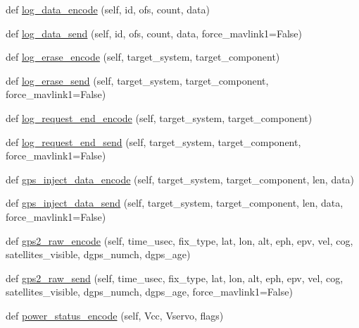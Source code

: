 \begin{DoxyCompactItemize}
\item 
def \hyperlink{classpymavlink_1_1dialects_1_1v10_1_1MAVLink_abf72df1eed5d0c8715720c2bd14c33c7}{log\+\_\+data\+\_\+encode} (self, id, ofs, count, data)
\item 
def \hyperlink{classpymavlink_1_1dialects_1_1v10_1_1MAVLink_ad56e75fea074bab726d216c0168854ac}{log\+\_\+data\+\_\+send} (self, id, ofs, count, data, force\+\_\+mavlink1=False)
\item 
def \hyperlink{classpymavlink_1_1dialects_1_1v10_1_1MAVLink_ad18343a2660ccd8e7c4ca8860cbc864a}{log\+\_\+erase\+\_\+encode} (self, target\+\_\+system, target\+\_\+component)
\item 
def \hyperlink{classpymavlink_1_1dialects_1_1v10_1_1MAVLink_a490ae561c069e23a64a2b53cd5ad55c0}{log\+\_\+erase\+\_\+send} (self, target\+\_\+system, target\+\_\+component, force\+\_\+mavlink1=False)
\item 
def \hyperlink{classpymavlink_1_1dialects_1_1v10_1_1MAVLink_a4c1900a7ffb5b8ef7ac90eccac9fe886}{log\+\_\+request\+\_\+end\+\_\+encode} (self, target\+\_\+system, target\+\_\+component)
\item 
def \hyperlink{classpymavlink_1_1dialects_1_1v10_1_1MAVLink_a36ee9dc492940d4d54b5c0b4d95f3016}{log\+\_\+request\+\_\+end\+\_\+send} (self, target\+\_\+system, target\+\_\+component, force\+\_\+mavlink1=False)
\item 
def \hyperlink{classpymavlink_1_1dialects_1_1v10_1_1MAVLink_a01573fb71a7ef4636652f95a3a255eea}{gps\+\_\+inject\+\_\+data\+\_\+encode} (self, target\+\_\+system, target\+\_\+component, len, data)
\item 
def \hyperlink{classpymavlink_1_1dialects_1_1v10_1_1MAVLink_a3f7f176cd16a16186c333b3e1a28e394}{gps\+\_\+inject\+\_\+data\+\_\+send} (self, target\+\_\+system, target\+\_\+component, len, data, force\+\_\+mavlink1=False)
\item 
def \hyperlink{classpymavlink_1_1dialects_1_1v10_1_1MAVLink_ab4c1a2230160becc07205df19f831a77}{gps2\+\_\+raw\+\_\+encode} (self, time\+\_\+usec, fix\+\_\+type, lat, lon, alt, eph, epv, vel, cog, satellites\+\_\+visible, dgps\+\_\+numch, dgps\+\_\+age)
\item 
def \hyperlink{classpymavlink_1_1dialects_1_1v10_1_1MAVLink_ad6cd4b0f732166f4697d1d4f684aa435}{gps2\+\_\+raw\+\_\+send} (self, time\+\_\+usec, fix\+\_\+type, lat, lon, alt, eph, epv, vel, cog, satellites\+\_\+visible, dgps\+\_\+numch, dgps\+\_\+age, force\+\_\+mavlink1=False)
\item 
def \hyperlink{classpymavlink_1_1dialects_1_1v10_1_1MAVLink_aa3e4bc66a128e509240f2f4713f1490c}{power\+\_\+status\+\_\+encode} (self, Vcc, Vservo, flags)

\end{DoxyCompactItemize}
